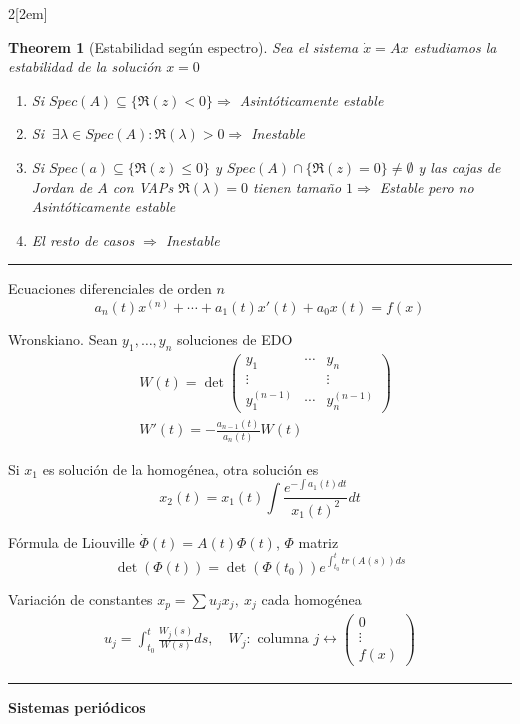\documentclass[leqno]{article}
\newtheorem*{theorem}{Theorem}
\begin{document}
\begin{multicols}{2}[\columnsep2em]
\begin{theorem}[Estabilidad según espectro] Sea el sistema $\dot{x}=Ax$ estudiamos la estabilidad de la solución $x=0$
  \begin{enumerate}[topsep=-6pt, itemsep=0pt] 
    \item Si $Spec(A)\subseteq \{\Re(z)<0\} \Rightarrow $ Asintóticamente estable
    \item Si $\ \exists \lambda\in Spec(A): \Re(\lambda)>0 \Rightarrow $ Inestable
	\item Si $Spec(a)\subseteq \{\Re (z)\le 0\}$ y $Spec(A)\cap \{\Re(z)=0\}\neq \emptyset$ y las cajas de Jordan de $A$ con VAPs $\Re(\lambda)=0$ tienen tamaño $1 \Rightarrow $ Estable pero no Asintóticamente estable
	\item El resto de casos $\Rightarrow$ Inestable
  \end{enumerate}
\end{theorem}
\hrule
Ecuaciones diferenciales de orden $n$
 \[
a_n(t)x^{(n)} + \cdots + a_1(t)x'(t) + a_0x(t) = f(x)
\] 

Wronskiano. Sean $y_1, \ldots , y_n$ soluciones de EDO
\begin{align*}
  & W(t) = \det \begin{pmatrix} y_1 & \cdots & y_n \\ \vdots & & \vdots \\ y^{(n-1)}_1 & \cdots & y^{(n-1)}_n  \end{pmatrix}  \\
  & W'(t) = - \frac{a_{n-1}(t)}{a_{n}(t)}W(t)
\end{align*}

Si $x_1$ es solución de la homogénea, otra solución es
 \[
x_2(t) =  x_1(t) \int \frac{e^{-\int a_1(t)dt}}{x_1(t)^2}dt
\] 

Fórmula de Liouville $\dot{\Phi}(t) = A(t)\Phi(t)$, $\Phi$ matriz
\[
\det (\Phi(t)) = \det(\Phi(t_0))e^{\int _{t_0}^t tr(A(s))ds}
\]

Variación de constantes $x_p = \sum u_jx_j, \ x_j$ cada homogénea
\begin{align*}
  u_j = \int_{t_0}^t \frac{W_j(s)}{W(s)}ds, \quad W_j: \text{ columna } j \leftrightarrow \begin{pmatrix} 0 \\ \vdots \\ f(x) \end{pmatrix}  
\end{align*}

\hrule

\textbf{Sistemas periódicos}


\end{multicols}
\end{document}
